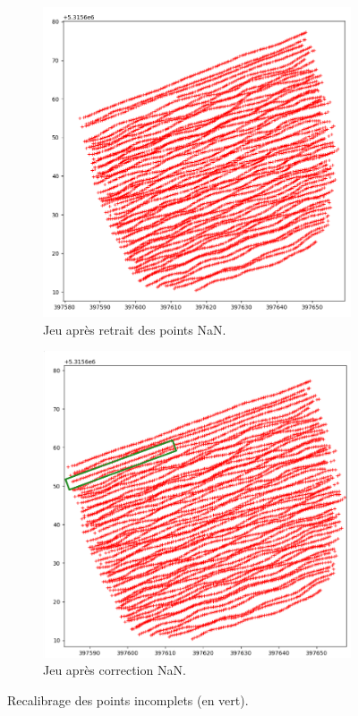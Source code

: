 \documentclass[12pt]{article}
\begin{document}
    \begin{figure}[ht!]
        \centering
        \begin{subfigure}[b]{0.475\textwidth}
            \centering
            \includegraphics[width=\textwidth]{Images/Na_Avant2.png}
            \caption[]%
            {{ \small Jeu après retrait des points NaN.}}    
        \end{subfigure}
        \hfill
        \begin{subfigure}[b]{0.475\textwidth}  
            \centering 
            \includegraphics[width=\textwidth]{Images/Na_Apres2.png}
            \caption[]%
            {{\small Jeu après correction NaN.}}    
        \end{subfigure}
        \caption{Recalibrage des points incomplets (en vert).}
    \end{figure}
    
\end{document}
